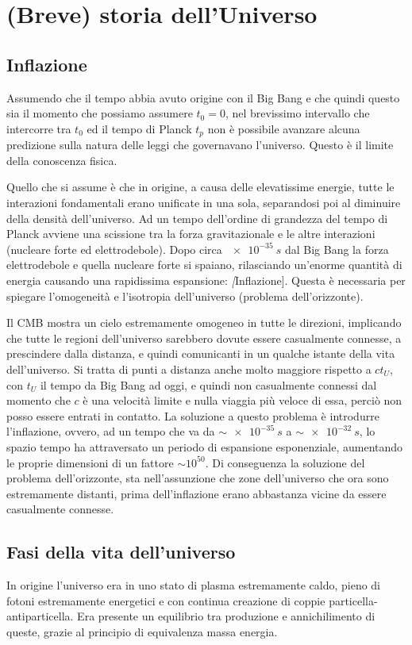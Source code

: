 \section{(Breve) storia dell'Universo}\label{sec:storia-universo}
\subsection{Inflazione}\label{inflazione}
Assumendo che il tempo abbia avuto origine con il Big Bang e che quindi questo sia il momento che possiamo assumere $t_0=0$, nel brevissimo intervallo che intercorre tra $t_0$ ed il tempo di Planck $t_p$ non è possibile avanzare alcuna predizione sulla natura delle leggi che governavano l'universo. Questo è il limite della conoscenza fisica.

Quello che si assume è che in origine, a causa delle elevatissime energie, tutte le interazioni fondamentali erano unificate in una sola, separandosi poi al diminuire della densità dell'universo. Ad un tempo dell'ordine di grandezza del tempo di Planck avviene una scissione tra la forza gravitazionale e le altre interazioni (nucleare forte ed elettrodebole). Dopo circa $\SI{e-35}{s}$ dal Big Bang la forza elettrodebole e quella nucleare forte si spaiano, rilasciando un'enorme quantità di energia causando una rapidissima espansione: \textit[Inflazione]. Questa è necessaria per spiegare l'omogeneità e l'isotropia dell'universo (problema dell'orizzonte).

Il CMB mostra un cielo estremamente omogeneo in tutte le direzioni, implicando che tutte le regioni dell'universo sarebbero dovute essere casualmente connesse, a prescindere dalla distanza, e quindi comunicanti in un qualche istante della vita dell'universo. Si tratta di punti a distanza anche molto maggiore rispetto a $ct_U$, con $t_U$ il tempo da Big Bang ad oggi, e quindi non casualmente connessi dal momento che $c$ è una velocità limite e nulla viaggia più veloce di essa, perciò non posso essere entrati in contatto. La soluzione a questo problema è introdurre l'inflazione, ovvero, ad un tempo che va da $\sim \SI{e-35}{s}$ a $\sim \SI{e-32}{s}$, lo spazio tempo ha attraversato un periodo di espansione esponenziale, aumentando le proprie dimensioni di un fattore $\sim 10^{50}$. Di conseguenza la soluzione del problema dell'orizzonte, sta nell'assunzione che zone dell'universo che ora sono estremamente distanti, prima dell'inflazione erano abbastanza vicine da essere casualmente connesse.

\subsection{Fasi della vita dell'universo}\label{sec:fasi-universo}
In origine l'universo era in uno stato di plasma estremamente caldo, pieno di fotoni estremamente energetici e con continua creazione di coppie particella-antiparticella. Era presente un equilibrio tra produzione e annichilimento di queste, grazie al principio di equivalenza massa energia. 

